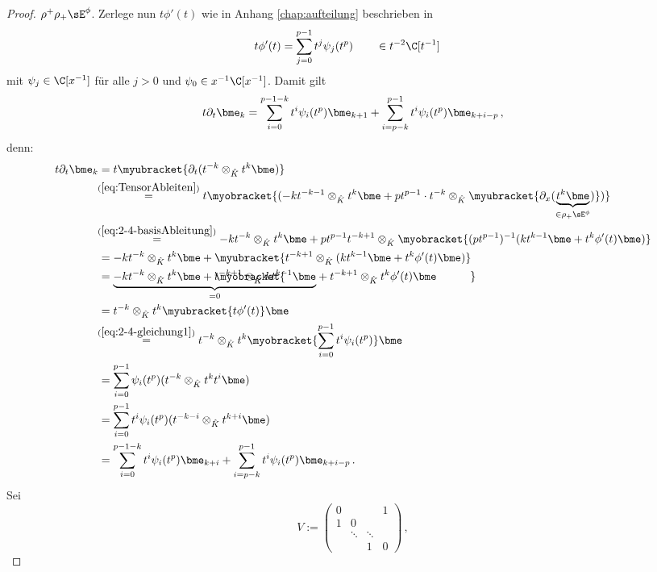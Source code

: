 \begin{proof}
$\rho^+\rho_+\sE^\phi$.
Zerlege nun $t\phi'(t)$ wie in Anhang \ref{chap:aufteilung} beschrieben in
\begin{align} \label{eq:2-4-gleichung1}
t\phi'(t)&=\sum_{j=0}^{p-1}t^j\psi_j(t^p) \qquad\in t^{-2}\C[t^{-1}]
\end{align}
mit $\psi_j\in\C[x^{-1}]$ für alle $j>0$ und $\psi_0\in x^{-1}\C[x^{-1}]$.
Damit gilt
\[
t\partial_t\bme_k= \sum_{i=0}^{p-1-k}t^i\psi_i(t^p)\bme_{k+1} +
  \sum_{i=p-k}^{p-1}t^i\psi_i(t^p)\bme_{k+i-p} \,,
\]
denn:
\begin{align*}
t\partial_t\bme_k &= 
  t\myubracket{\partial_t(t^{-k}\otimes_{\hat K}t^k\bme)}\\
  &\!\!\overset{(\ref{eq:TensorAbleiten})}{=} 
    t\myobracket{(-kt^{-k-1}\otimes_{\hat K}t^k\bme +
    pt^{p-1}\cdot t^{-k}\otimes_{\hat K}\myubracket{\partial_x
    (\underset{\in\rho_+\sE^\phi}{\underbrace{t^k\bme}})})}\\
  &\!\!\overset{(\ref{eq:2-4-basisAbleitung})}{=} -kt^{-k}\otimes_{\hat K}t^k\bme +
    pt^{p-1}t^{-k+1}\otimes_{\hat K}\myobracket{(pt^{p-1})^{-1} (kt^{k-1}\bme
    + t^k\phi'(t)\bme)}\\
  &= -kt^{-k}\otimes_{\hat K}t^k\bme +
    \myubracket{t^{-k+1}\otimes_{\hat K}(kt^{k-1}\bme + t^k\phi'(t)\bme)}\\
  &= \underset{=0}{\underbrace{-kt^{-k}\otimes_{\hat K}t^k\bme +
    \rlap{$\myobracket{\phantom{x^x\qquad\qquad\qquad\qquad\qquad\qquad\qquad%
      \,\,\,\,\,\,\,\,}}$}
    t^{-k+1}\otimes_{\hat K}kt^{k-1}\bme}} +
    t^{-k+1}\otimes_{\hat K}t^k\phi'(t)\bme\\
  &= t^{-k}\otimes_{\hat K}t^{k}\myubracket{t\phi'(t)}\bme\\
  &\!\!\overset{(\ref{eq:2-4-gleichung1})}{=}t^{-k}\otimes_{\hat K}
    t^{k} \myobracket{\sum_{i=0}^{p-1}t^i\psi_i(t^p)} \bme\\
  &=\sum_{i=0}^{p-1}\psi_i(t^p)(t^{-k}\otimes_{\hat K} t^{k} t^i \bme)\\
  &=\sum_{i=0}^{p-1}t^i\psi_i(t^p)(t^{-k-i}\otimes_{\hat K} t^{k+i} \bme)\\
  &= \sum_{i=0}^{p-1-k}t^i\psi_i(t^p)\bme_{k+i} +
  \sum_{i=p-k}^{p-1}t^i\psi_i(t^p)\bme_{k+i-p} \,.
\end{align*}
Sei
\[
V:=\begin{pmatrix}
0 &        &          & 1\\
1 & 0\\
  & \ddots & \ddots\\
  &        & 1        & 0
\end{pmatrix} \,,
\]
\end{proof}
